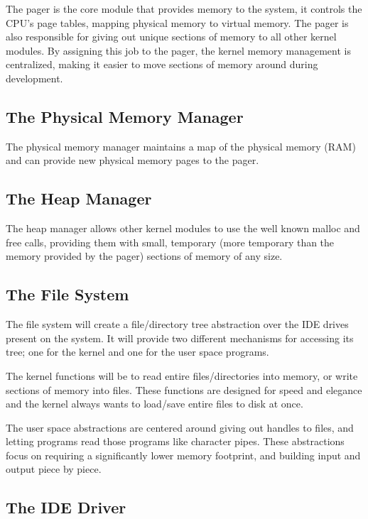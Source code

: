 \documentclass[a4paper]{report}
\begin{document}
The pager is the core module that provides memory to the system, it controls the CPU's page tables, mapping physical memory to virtual memory. The pager is also responsible for giving out unique sections of memory to all other kernel modules. By assigning this job to the pager, the kernel memory management is centralized, making it easier to move sections of memory around during development.

\subsection{The Physical Memory Manager}

The physical memory manager maintains a map of the physical memory (RAM) and can provide new physical memory pages to the pager.

\subsection{The Heap Manager}

The heap manager allows other kernel modules to use the well known malloc and free calls, providing them with small, temporary (more temporary than the memory provided by the pager) sections of memory of any size.

\subsection{The File System}

The file system will create a file/directory tree abstraction over the IDE drives present on the system. It will provide two different mechanisms for accessing its tree; one for the kernel and one for the user space programs.

The kernel functions will be to read entire files/directories into memory, or write sections of memory into files. These functions are designed for speed and elegance and the kernel always wants to load/save entire files to disk at once.

The user space abstractions are centered around giving out handles to files, and letting programs read those programs like character pipes. These abstractions focus on requiring a significantly lower memory footprint, and building input and output piece by piece.

\subsection{The IDE Driver}
\end{document}

